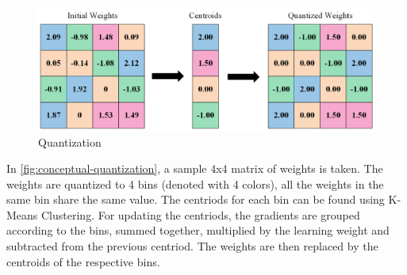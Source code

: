 \documentclass{ioereport}
\begin{document}
    \begin{figure}[H]
            \centering
            \includegraphics[width=\linewidth]{assets/conceptual figure of quantization.png}
            \caption{Quantization}
            \label{fig:conceptual-quantization}
    \end{figure}
    In \autoref{fig:conceptual-quantization}, a sample 4x4 matrix of weights is taken. The weights are quantized to 4 bins (denoted with 4 colors), all the weights in the same bin share the same value. The centriods for each bin can be found using K-Means Clustering. For updating the centriods, the gradients  are grouped according to the bins, summed together, multiplied by the learning weight and subtracted from the previous centriod. The weights are then replaced by the centroids of the respective bins.
        
\end{document}
